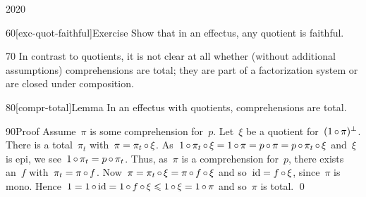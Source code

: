 \begin{parsec}{2020}
\begin{point}{60}[exc-quot-faithful]{Exercise}
Show that in an effectus, any quotient is faithful.
\end{point}
\begin{point}{70}%
In contrast to quotients,
    it is not clear at all whether (without additional assumptions)
    comprehensions are total;
    they are part of a factorization system
    or are closed under composition.
\end{point}
\begin{point}{80}[compr-total]{Lemma}%
In an effectus with quotients, comprehensions are total.
\begin{point}{90}{Proof}%
Assume~$\pi$ is some comprehension for~$p$.
Let~$\xi$ be a quotient for~$(1 \mathop{\circ} \pi)^\perp$.
There is a total~$\pi_t$ with~$\pi = \pi_t \mathop{\circ} \xi$.
As~$ 1 \mathop{\circ} \pi_t \mathop{\circ} \xi
        = 1 \mathop{\circ} \pi
        = p \mathop{\circ} \pi
        = p \mathop{\circ} \pi_t \mathop{\circ} \xi$
        and~$\xi$ is epi,
        we see~$1 \mathop{\circ} \pi_t = p \mathop{\circ} \pi_t$.
Thus, as~$\pi$ is a comprehension for~$p$,
    there exists an~$f$ with~$\pi_t = \pi \mathop{\circ} f$.
Now~$\pi = \pi_t \mathop{\circ} \xi = \pi \mathop{\circ} f \mathop{\circ} \xi$
    and so~$\mathrm{id} = f \mathop{\circ} \xi$, since~$\pi$ is mono.
Hence~$1 = 1 \mathop{\circ} \mathrm{id} =1 \mathop{\circ} f \mathop{\circ} \xi \leqslant 1 \mathop{\circ} \xi = 1 \mathop{\circ} \pi$
    and so~$\pi$ is total. \qed
\end{point}
\end{point}
\end{parsec}
